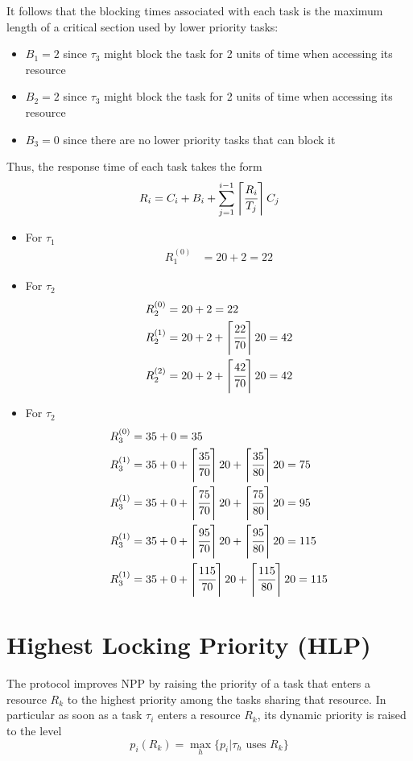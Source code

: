{It follows that the blocking times associated with each task is the maximum length of a critical section used by lower priority tasks:
\begin{itemize}
    \item $B_1 = 2$ since $\tau_3$ might block the task for 2 units of time when accessing its resource
    \item $B_2 = 2$ since $\tau_3$ might block the task for 2 units of time when accessing its resource
    \item $B_3 = 0$ since there are no lower priority tasks that can block it
\end{itemize}
Thus, the response time of each task takes the form 
\[R_i = C_i + B_i + \sum_{j=1}^{i-1} \left\lceil \cfrac{R_i}{T_j} \right\rceil C_j\]
\begin{itemize}
    \item For $\tau_1$
    \begin{align*}
        R_1^{(0)} &= 20 + 2 = 22
    \end{align*}
    \item For $\tau_2$
    \begin{align*}
        R_2^{(0)} &= 20 + 2 = 22\\
        R_2^{(1)} &= 20 + 2 + \left\lceil \cfrac{22}{70} \right\rceil20 = 42\\
        R_2^{(2)} &= 20 + 2 + \left\lceil \cfrac{42}{70} \right\rceil20 = 42
    \end{align*}
    \item For $\tau_2$
    \begin{align*}
        R_3^{(0)} &= 35 + 0 = 35\\
        R_3^{(1)} &= 35 + 0 + \left\lceil \cfrac{35}{70} \right\rceil20 + \left\lceil \cfrac{35}{80} \right\rceil20 = 75\\
        R_3^{(1)} &= 35 + 0 + \left\lceil \cfrac{75}{70} \right\rceil20 + \left\lceil \cfrac{75}{80} \right\rceil20 = 95\\
        R_3^{(1)} &= 35 + 0 + \left\lceil \cfrac{95}{70} \right\rceil20 + \left\lceil \cfrac{95}{80} \right\rceil20 = 115\\
        R_3^{(1)} &= 35 + 0 + \left\lceil \cfrac{115}{70} \right\rceil20 + \left\lceil \cfrac{115}{80} \right\rceil20 = 115
    \end{align*}
\end{itemize}

}

\section{Highest Locking Priority (HLP)}
The  protocol improves NPP by raising the priority of a task that enters a resource $R_k$ to the highest priority among the tasks sharing that resource. In particular as soon as a task $\tau_i$ enters a resource $R_k$, its dynamic priority is raised to the level
\begin{equation}
\label{eq:equation2}
p_i(R_k) = \max_h\{p_i | \tau_h \text{ uses } R_k\}
\end{equation}


